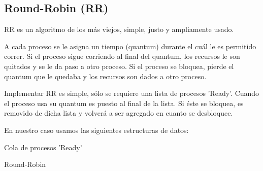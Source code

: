 \subsection{Round-Robin (RR)}
RR es un algoritmo de los más viejos, simple, justo y ampliamente usado.

A cada proceso se le asigna un tiempo (quantum) durante el cuál le es permitido correr.
Si el proceso sigue corriendo al final del quantum, los recursos le son quitados y se le da paso a otro proceso.
Si el proceso se bloquea, pierde el quantum que le quedaba y los recursos son dados a otro proceso.

Implementar RR es simple, sólo se requiere una lista de procesos 'Ready'.
Cuando el proceso usa su quantum es puesto al final de la lista. 
Si éste se bloquea, es removido de dicha lista y volverá a ser agregado en cuanto se desbloquee.

En nuestro caso usamos las siguientes estructuras de datos:
 \begin{description}
  \item[Cola de procesos 'Ready']{}
 \end{description}

\begin{algorithm}
 \caption{Round-Robin}
 \begin{algorithmic}[1] 
 \EndProcedure


 \EndProcedure


   \Else
	 \EndIf	    
      \EndIf
   \EndIf
 \EndProcedure

 
    \Else
    \EndIf
 \EndProcedure
 \end{algorithmic}
\end{algorithm}

